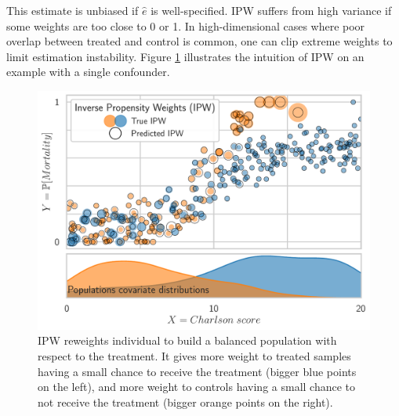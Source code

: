 \documentclass[french,12pt,twoside,a4paper]{book}
\begin{document}
\begin{appendices}
  This estimate is unbiased if $\hat e$ is well-specified. IPW suffers from high
  variance if some weights are too close to 0 or 1. In high-dimensional cases
  where poor overlap between treated and control is common, one can clip extreme
  weights to limit estimation instability. Figure \ref{apd:ipw_intuition}
  illustrates the intuition of IPW on an example with a single confounder.

  \begin{figure}[!t]
    \centering
    \includegraphics[width=0.8\linewidth]{img/chapter_4/ipw_model__RandomForestClassifier.pdf}
    \caption{IPW reweights individual to build a balanced population with
      respect to the treatment. It gives more weight to treated samples having a
      small chance to receive the treatment (bigger blue points on the left), and
      more weight to controls having a small chance to not receive the treatment
      (bigger orange points on the right).}
    \label{apd:ipw_intuition}
  \end{figure}


\end{appendices}
\end{document}
